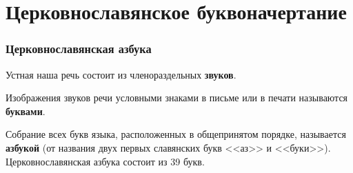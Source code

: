 \documentclass[11pt,a4paper,oneside]{memoir}
\begin{document}
\section{Церковнославянское буквоначертание}
\subsubsection{Церковнославянская азбука}

Устная наша речь состоит из членораздельных \textbf{звуков}.

Изображения звуков речи условными знаками в письме или в печати называются \textbf{буквами}.

Собрание всех букв языка, расположенных в общепринятом порядке, называется \textbf{азбукой} (от названия двух первых славянских букв <<аз>> и <<буки>>). Церковнославянская азбука состоит из 39 букв.
\end{document}
